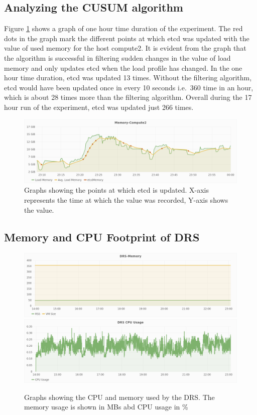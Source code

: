 \subsection{Analyzing the CUSUM algorithm}
Figure \ref{fig:etcd} shows a graph of one hour time duration of the experiment. The red dots in the graph mark the different points at which etcd was updated with the value of used memory for the host compute2. It is evident from the graph that the algorithm is successful in filtering sudden changes in the value of load memory and only updates etcd when the load profile has changed. In the one hour time duration, etcd was updated 13 times. Without the filtering algorithm, etcd would have been updated once in every 10 seconds i.e.\ 360 time in an hour, which is about 28 times more than the filtering algorithm. Overall during the 17 hour run of the experiment, etcd was updated just 266 times.
\begin{figure}
  \centering
  \includegraphics[width=\textwidth]{etcd-mem.png}
  \caption{Graphs showing the points at which etcd is updated. X-axis represents the time at which the value was recorded, Y-axis shows the value.}\label{fig:etcd}
\end{figure}

\subsection{Memory and CPU Footprint of DRS}
\begin{figure}[!htbp]
  \centering
  \includegraphics[width=\textwidth]{mem-self.png}
  \includegraphics[width=\textwidth]{cpu-self.png}
  \caption{Graphs showing the CPU and memory used by the DRS. The memory usage is shown in MBs abd CPU usage in \%}\label{fig:self}
\end{figure}

